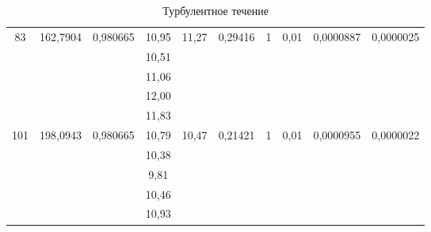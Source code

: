 \documentclass[a4paper, 12pt]{article}
\begin{document}
\begin{table}[h!]
\begin{tabular}{|c|c|c|c|c|c|c|c|c|c|}
\multirow{5}{*}{83}  & \multirow{5}{*}{162,7904} & \multirow{5}{*}{0,980665} & 10,95 & \multirow{5}{*}{11,27}         & \multirow{5}{*}{0,29416}          & \multirow{5}{*}{1} & \multirow{5}{*}{0,01} & \multirow{5}{*}{0,0000887} & \multirow{5}{*}{0,0000025}   \\ \cline{4-4}
                     &                           &                           & 10,51 &                                &                                   &                    &                       &                            &                              \\ \cline{4-4}
                     &                           &                           & 11,06 &                                &                                   &                    &                       &                            &                              \\ \cline{4-4}
                     &                           &                           & 12,00 &                                &                                   &                    &                       &                            &                              \\ \cline{4-4}
                     &                           &                           & 11,83 &                                &                                   &                    &                       &                            &                              \\ \hline
\multirow{5}{*}{101} & \multirow{5}{*}{198,0943} & \multirow{5}{*}{0,980665} & 10,79 & \multirow{5}{*}{10,47}         & \multirow{5}{*}{0,21421}          & \multirow{5}{*}{1} & \multirow{5}{*}{0,01} & \multirow{5}{*}{0,0000955} & \multirow{5}{*}{0,0000022}   \\ \cline{4-4}
                     &                           &                           & 10,38 &                                &                                   &                    &                       &                            &                              \\ \cline{4-4}
                     &                           &                           & 9,81  &                                &                                   &                    &                       &                            &                              \\ \cline{4-4}
                     &                           &                           & 10,46 &                                &                                   &                    &                       &                            &                              \\ \cline{4-4}
                     &                           &                           & 10,93 &                                &                                   &                    &                       &                            &                              \\ \hline
\end{tabular}
\caption{Турбулентное течение}
\label{tab5}
\end{table}
\end{document}
